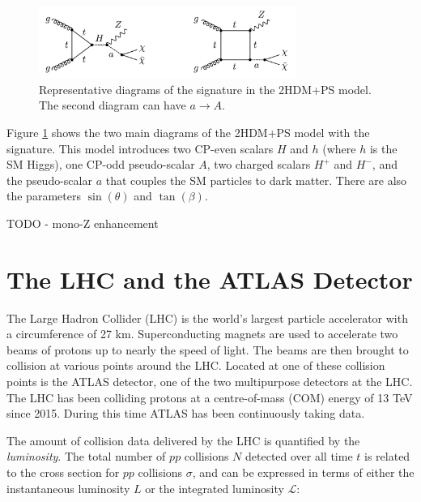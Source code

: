 \begin{figure}[htb]
\centering
\includegraphics[width=0.75\textwidth]{Figures/2hdma.png}
\caption{Representative diagrams of the \monoZ signature in the 2HDM+PS model. The second diagram can have $a \rightarrow A$.}
\label{fig:2hdma}
\end{figure}

Figure \ref{fig:2hdma} shows the two main diagrams of the 2HDM+PS model with the \monoZ signature. This model introduces two CP-even scalars $H$ and $h$ (where $h$ is the SM Higgs), one CP-odd pseudo-scalar $A$, two charged scalars $H^+$ and $H^-$, and the pseudo-scalar $a$ that couples the SM particles to dark matter. There are also the parameters $\sin(\theta)$ and $\tan(\beta)$.

{\color{red}TODO}
- mono-Z enhancement \\

\clearpage

\section{The LHC and the ATLAS Detector}

The Large Hadron Collider (LHC) is the world's largest particle accelerator with a circumference of 27 km. Superconducting magnets are used to accelerate two beams of protons up to nearly the speed of light. The beams are then brought to collision at various points around the LHC. Located at one of these collision points is the ATLAS detector, one of the two multipurpose detectors at the LHC. The LHC has been colliding protons at a centre-of-mass (COM) energy of 13 TeV since 2015. During this time ATLAS has been continuously taking data.

The amount of \pp collision data delivered by the LHC is quantified by the \textit{luminosity}. The total number of $pp$ collisions $N$ detected over all time $t$ is related to the cross section for $pp$ collisions $\sigma$, and can be expressed in terms of either the instantaneous luminosity $L$ or the integrated luminosity $\mathcal{L}$:

